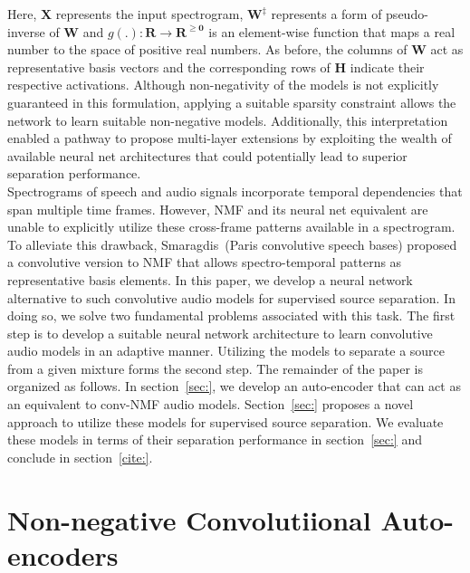 \documentclass{article}
\begin{document}
Here, $\mathbf{X}$ represents the input spectrogram, $\mathbf{W^{\ddagger}}$ represents a form of pseudo-inverse of $\mathbf{W}$ and $g(.):\mathbf{R}\rightarrow \mathbf{R^{\geq0}}$ is an element-wise function that maps a real number to the space of positive real numbers. As before, the columns of $\mathbf{W}$ act as representative basis vectors and the corresponding rows of $\mathbf{H}$ indicate their respective activations. Although non-negativity of the models is not explicitly guaranteed in this formulation, applying a suitable sparsity constraint allows the network to learn suitable non-negative models. Additionally, this interpretation enabled a pathway to propose multi-layer extensions by exploiting the wealth of available neural net architectures that could potentially lead to superior separation performance. \\

Spectrograms of speech and audio signals incorporate temporal dependencies that span multiple time frames. However, NMF and its neural net equivalent are unable to explicitly utilize these cross-frame patterns available in a spectrogram. To alleviate this drawback, Smaragdis~\cite{}(Paris convolutive speech bases) proposed a convolutive version to NMF that allows spectro-temporal patterns as representative basis elements. In this paper, we develop a neural network alternative to such convolutive audio models for supervised source separation. In doing so, we solve two fundamental problems associated with this task. The first step is to develop a suitable neural network architecture to learn convolutive audio models in an adaptive manner. Utilizing the models to separate a source from a given mixture forms the second step. The remainder of the paper is organized as follows. In section~\ref{sec:}, we develop an auto-encoder that can act as an equivalent to conv-NMF audio models. Section~\ref{sec:} proposes a novel approach to utilize these models for supervised source separation. We evaluate these models in terms of their separation performance in section~\ref{sec:} and conclude in section~\ref{cite:}. \\

\section{Non-negative Convolutiional Auto-encoders}
\end{document}
